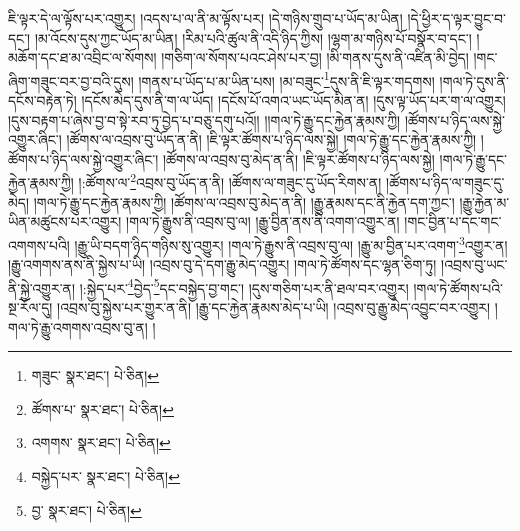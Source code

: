 ཇི་ལྟར་དེ་ལ་ལྟོས་པར་འགྱུར། །འདས་པ་ལ་ནི་མ་ལྟོས་པར། །དེ་གཉིས་གྲུབ་པ་ཡོད་མ་ཡིན། །དེ་ཕྱིར་ད་ལྟར་བྱུང་བ་དང་། །མ་འོངས་དུས་ཀྱང་ཡོད་མ་ཡིན། །རིམ་པའི་ཚུལ་ནི་འདི་ཉིད་ཀྱིས། །ལྷག་མ་གཉིས་པོ་བསྣོར་བ་དང་། །མཆོག་དང་ཐ་མ་འབྲིང་ལ་སོགས། །གཅིག་ལ་སོགས་པའང་ཤེས་པར་བྱ། །མི་གནས་དུས་ནི་འཛིན་མི་བྱེད། །གང་ཞིག་གཟུང་བར་བྱ་བའི་དུས། །གནས་པ་ཡོད་པ་མ་ཡིན་པས། །མ་བཟུང་\footnote{གཟུང་  སྣར་ཐང་།  པེ་ཅིན། }དུས་ནི་ཇི་ལྟར་གདགས། །གལ་ཏེ་དུས་ནི་དངོས་བརྟེན་ཏེ། །དངོས་མེད་དུས་ནི་ག་ལ་ཡོད། །དངོས་པོ་འགའ་ཡང་ཡོད་མིན་ན། །དུས་ལྟ་ཡོད་པར་ག་ལ་འགྱུར། །དུས་བརྟག་པ་ཞེས་བྱ་བ་སྟེ་རབ་ཏུ་བྱེད་པ་བཅུ་དགུ་པའོ།། །།གལ་ཏེ་རྒྱུ་དང་རྐྱེན་རྣམས་ཀྱི། །ཚོགས་པ་ཉིད་ལས་སྐྱེ་འགྱུར་ཞིང་། །ཚོགས་ལ་འབྲས་བུ་ཡོད་ན་ནི། །ཇི་ལྟར་ཚོགས་པ་ཉིད་ལས་སྐྱེ། །གལ་ཏེ་རྒྱུ་དང་རྐྱེན་རྣམས་ཀྱི། །ཚོགས་པ་ཉིད་ལས་སྐྱེ་འགྱུར་ཞིང་། །ཚོགས་ལ་འབྲས་བུ་མེད་ན་ནི། །ཇི་ལྟར་ཚོགས་པ་ཉིད་ལས་སྐྱེ། །གལ་ཏེ་རྒྱུ་དང་རྐྱེན་རྣམས་ཀྱི། །:ཚོགས་ལ་\footnote{ཚོགས་པ་  སྣར་ཐང་།  པེ་ཅིན། }འབྲས་བུ་ཡོད་ན་ནི། །ཚོགས་ལ་གཟུང་དུ་ཡོད་རིགས་ན། །ཚོགས་པ་ཉིད་ལ་གཟུང་དུ་མེད། །གལ་ཏེ་རྒྱུ་དང་རྐྱེན་རྣམས་ཀྱི། །ཚོགས་ལ་འབྲས་བུ་མེད་ན་ནི། །རྒྱུ་རྣམས་དང་ནི་རྐྱེན་དག་ཀྱང་། །རྒྱུ་རྐྱེན་མ་ཡིན་མཚུངས་པར་འགྱུར། །གལ་ཏེ་རྒྱུས་ནི་འབྲས་བུ་ལ། །རྒྱུ་བྱིན་ནས་ནི་འགག་འགྱུར་ན། །གང་བྱིན་པ་དང་གང་འགགས་པའི། །རྒྱུ་ཡི་བདག་ཉིད་གཉིས་སུ་འགྱུར། །གལ་ཏེ་རྒྱུས་ནི་འབྲས་བུ་ལ། །རྒྱུ་མ་བྱིན་པར་འགག་\footnote{འགགས་  སྣར་ཐང་།  པེ་ཅིན། }འགྱུར་ན། །རྒྱུ་འགགས་ནས་ནི་སྐྱེས་པ་ཡི། །འབྲས་བུ་དེ་དག་རྒྱུ་མེད་འགྱུར། །གལ་ཏེ་ཚོགས་དང་ལྷན་ཅིག་ཏུ། །འབྲས་བུ་ཡང་ནི་སྐྱེ་འགྱུར་ན། །:སྐྱེད་པར་\footnote{བསྐྱེད་པར་  སྣར་ཐང་།  པེ་ཅིན། }བྱེད་\footnote{བྱ་  སྣར་ཐང་།  པེ་ཅིན། }དང་བསྐྱེད་བྱ་གང་། །དུས་གཅིག་པར་ནི་ཐལ་བར་འགྱུར། །གལ་ཏེ་ཚོགས་པའི་སྔ་རོལ་དུ། །འབྲས་བུ་སྐྱེས་པར་གྱུར་ན་ནི། །རྒྱུ་དང་རྐྱེན་རྣམས་མེད་པ་ཡི། །འབྲས་བུ་རྒྱུ་མེད་འབྱུང་བར་འགྱུར། །གལ་ཏེ་རྒྱུ་འགགས་འབྲས་བུ་ན། །
